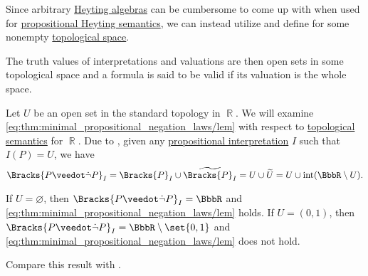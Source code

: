 \begin{definition}\label{def:propositional_topological_semantics}
  Since arbitrary \hyperref[def:heyting_algebra]{Heyting algebras} can be cumbersome to come up with when used for \hyperref[def:propositional_heyting_algebra_semantics]{propositional Heyting semantics}, we can instead utilize  and define  for some nonempty \hyperref[def:topological_space]{topological space}.

  The truth values of interpretations and valuations are then open sets in some topological space and a formula is said to be valid if its valuation is the whole space.
\end{definition}

\begin{example}\label{ex:topological_semantics_lem_counterexample}
  Let \( U \) be an open set in the standard topology in \( \BbbR \). We will examine \eqref{eq:thm:minimal_propositional_negation_laws/lem} with respect to \hyperref[def:propositional_topological_semantics]{topological semantics} for \( \BbbR \). Due to , given any \hyperref[def:propositional_valuation]{propositional interpretation} \( I \) such that \( I(P) = U \), we have
  \begin{equation*}
    \Bracks{P \synvee \synneg P}_I
    =
    \Bracks{P}_I \cup \widetilde{\Bracks{P}_I}
    =
    U \cup \widetilde{U}
    =
    U \cup \Int(\BbbR \setminus U).
  \end{equation*}

  If \( U = \varnothing \), then \( \Bracks{P \synvee \synneg P}_I = \BbbR \) and \eqref{eq:thm:minimal_propositional_negation_laws/lem} holds. If \( U = (0, 1) \), then \( \Bracks{P \synvee \synneg P}_I = \BbbR \setminus \set{ 0, 1 } \) and \eqref{eq:thm:minimal_propositional_negation_laws/lem} does not hold.

  Compare this result with .
\end{example}

